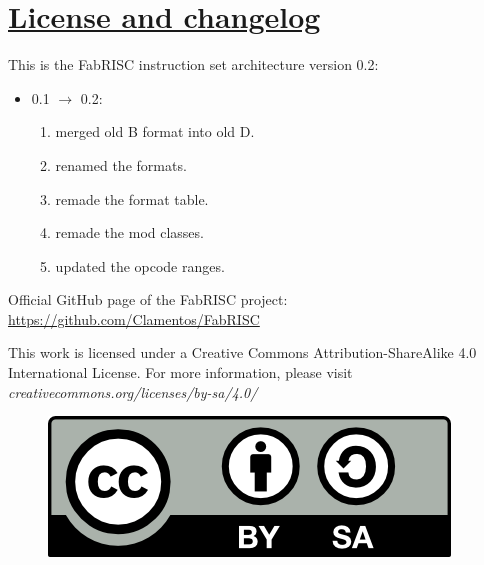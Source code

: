 \section[License and changelog]{\LARGE\underline{License and changelog}}

    This is the FabRISC instruction set architecture version 0.2:

    \begin{itemize}

        \item 0.1 $\rightarrow$ 0.2:

            \begin{enumerate}

                \item merged old B format into old D.
                \item renamed the formats.
                \item remade the format table.
                \item remade the mod classes.
                \item updated the opcode ranges.

            \end{enumerate}

    \end{itemize}

    \vspace{10pt}

    Official GitHub page of the FabRISC project: \url{https://github.com/Clamentos/FabRISC}

    \vspace{10pt}

    This work is licensed under a Creative Commons Attribution-ShareAlike 4.0 International License. For more information, please visit \textit{creativecommons.org/licenses/by-sa/4.0/}

    \begin{figure}[hbt!]

        \includegraphics[scale = 0.8]{./Images/LICENSE.png}
        \label{fig:LICENSE}
        
    \end{figure}